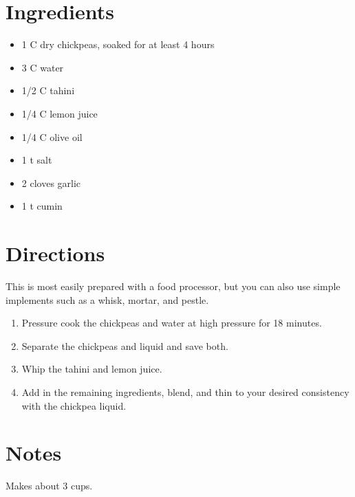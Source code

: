 \documentclass[letterpaper,10pt,english]{sphinxmanual}
\begin{document}
\section{Ingredients}
\label{hummus:ingredients}\begin{itemize}
\item {} 
1   C   dry chickpeas, soaked for at least 4 hours

\item {} 
3   C   water

\item {} 
1/2  C  tahini

\item {} 
1/4  C  lemon juice

\item {} 
1/4  C  olive oil

\item {} 
1   t   salt

\item {} 
2       cloves garlic

\item {} 
1   t   cumin

\end{itemize}


\section{Directions}
\label{hummus:directions}
This is most easily prepared with a food processor, but you can also use simple implements such as a whisk, mortar, and pestle.
\begin{enumerate}
\item {} 
Pressure cook the chickpeas and water at high pressure for 18 minutes.

\item {} 
Separate the chickpeas and liquid and save both.

\item {} 
Whip the tahini and lemon juice.

\item {} 
Add in the remaining ingredients, blend, and thin to your desired consistency with the chickpea liquid.

\end{enumerate}


\section{Notes}
\label{hummus:notes}
Makes about 3 cups.
\end{document}
